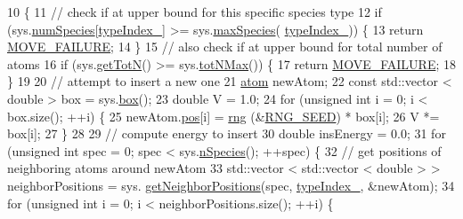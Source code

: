 \begin{DoxyCode}
10                                         \{
11     \textcolor{comment}{// check if at upper bound for this specific species type}
12     \textcolor{keywordflow}{if} (sys.\hyperlink{classsim_system_a9eea865e6dc1cff377b1e79c4d9c23f0}{numSpecies}[\hyperlink{classmc_move_acb731965547b0326ef318ec96da8b46a}{typeIndex\_}] >= sys.\hyperlink{classsim_system_a93259b517f449f1ac610d132ac66b551}{maxSpecies}(
      \hyperlink{classmc_move_acb731965547b0326ef318ec96da8b46a}{typeIndex\_})) \{
13         \textcolor{keywordflow}{return} \hyperlink{moves_8h_a9832cf5fcfa8c0894545b591c9908e39}{MOVE\_FAILURE};
14     \}
15     \textcolor{comment}{// also check if at upper bound for total number of atoms}
16     \textcolor{keywordflow}{if} (sys.\hyperlink{classsim_system_a37dd827f4057049763351510147b9f1d}{getTotN}() >= sys.\hyperlink{classsim_system_aee2c65ecb43a35c0c4d070cdb45f7dc0}{totNMax}()) \{
17                 \textcolor{keywordflow}{return} \hyperlink{moves_8h_a9832cf5fcfa8c0894545b591c9908e39}{MOVE\_FAILURE};
18     \}
19     
20                 \textcolor{comment}{// attempt to insert a new one}
21     \hyperlink{classatom}{atom} newAtom;
22     \textcolor{keyword}{const} std::vector < double > box = sys.\hyperlink{classsim_system_a8bff9dfb95b1b09a0fab2c1c485ade07}{box}();
23     \textcolor{keywordtype}{double} V = 1.0;
24     \textcolor{keywordflow}{for} (\textcolor{keywordtype}{unsigned} \textcolor{keywordtype}{int} i = 0; i < box.size(); ++i) \{
25         newAtom.\hyperlink{classatom_a3ae5f4880e7831d8b2c9fda72b4eb24a}{pos}[i] = \hyperlink{utilities_8cpp_a0f9542af4b475ac79cb679d7a8d14db0}{rng} (&\hyperlink{global_8h_a3f4e4ea24d5a5c66feae55d1f329c884}{RNG\_SEED}) * box[i];
26         V *= box[i];
27     \}
28     
29     \textcolor{comment}{// compute energy to insert}
30     \textcolor{keywordtype}{double} insEnergy = 0.0;
31     \textcolor{keywordflow}{for} (\textcolor{keywordtype}{unsigned} \textcolor{keywordtype}{int} spec = 0; spec < sys.\hyperlink{classsim_system_ab5e2e9b6204de15520302fe1d51688dd}{nSpecies}(); ++spec) \{
32                 \textcolor{comment}{// get positions of neighboring atoms around newAtom}
33                 std::vector < std::vector < double > > neighborPositions = sys.
      \hyperlink{classsim_system_a7ac49b2311cd8230df8d078a9d897b35}{getNeighborPositions}(spec, \hyperlink{classmc_move_acb731965547b0326ef318ec96da8b46a}{typeIndex\_}, &newAtom);
34         \textcolor{keywordflow}{for} (\textcolor{keywordtype}{unsigned} \textcolor{keywordtype}{int} i = 0; i < neighborPositions.size(); ++i) \{

\end{DoxyCode}
